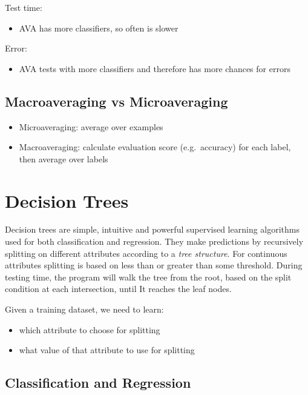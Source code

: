 \documentclass{article}
\begin{document}
Test time:

\begin{itemize}
\tightlist
\item
  AVA has more classifiers, so often is slower
\end{itemize}

Error:

\begin{itemize}
\tightlist
\item
  AVA tests with more classifiers and therefore has more chances for
  errors
\end{itemize}

\subsection{Macroaveraging vs
Microaveraging}\label{macroaveraging-vs-microaveraging}

\begin{itemize}
\tightlist
\item
  Microaveraging: average over examples
\item
  Macroaveraging: calculate evaluation score (e.g.~accuracy) for each
  label, then average over labels
\end{itemize}

\section{Decision Trees}\label{decision-trees}

Decision trees are simple, intuitive and powerful supervised learning
algorithms used for both classification and regression. They make
predictions by recursively splitting on different attributes according
to a \emph{tree structure}. For continuous attributes splitting is based
on less than or greater than some threshold. During testing time, the
program will walk the tree from the root, based on the split condition
at each intersection, until It reaches the leaf nodes.

Given a training dataset, we need to learn:

\begin{itemize}
\tightlist
\item
  which attribute to choose for splitting
\item
  what value of that attribute to use for splitting
\end{itemize}

\subsection{Classification and
Regression}\label{classification-and-regression}
\end{document}
